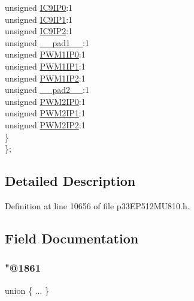 \begin{DoxyCompactItemize}
\begin{tabbing}
\>\>unsigned \hyperlink{structtag_i_p_c23_b_i_t_s_a5c35ef1d196139e7b212452a079ea4e5}{IC9IP0}:1\\
\>\>unsigned \hyperlink{structtag_i_p_c23_b_i_t_s_a2a0f50aa14d292daaa9cafe25a2d9338}{IC9IP1}:1\\
\>\>unsigned \hyperlink{structtag_i_p_c23_b_i_t_s_a6142a9a6f806d132e086c64963112700}{IC9IP2}:1\\
\>\>unsigned \hyperlink{structtag_i_p_c23_b_i_t_s_acaf2d0924a107ec6e8d2e31febaf66f9}{\_\_pad1\_\_}:1\\
\>\>unsigned \hyperlink{structtag_i_p_c23_b_i_t_s_a9616870737c59d2aa83118eb90d7c5f3}{PWM1IP0}:1\\
\>\>unsigned \hyperlink{structtag_i_p_c23_b_i_t_s_a7cf40cd6daf25f32f0d4a85917bdfdd8}{PWM1IP1}:1\\
\>\>unsigned \hyperlink{structtag_i_p_c23_b_i_t_s_aeb4e1806a75ab814d71a4c8b1f2041f0}{PWM1IP2}:1\\
\>\>unsigned \hyperlink{structtag_i_p_c23_b_i_t_s_a4d97cc5f7d51d22fc2bf3eab35c9cb7f}{\_\_pad2\_\_}:1\\
\>\>unsigned \hyperlink{structtag_i_p_c23_b_i_t_s_a29e3155251df4e526fc995fd9307bb1a}{PWM2IP0}:1\\
\>\>unsigned \hyperlink{structtag_i_p_c23_b_i_t_s_adf1274b1daffd4e654b8ae4a51dbd01f}{PWM2IP1}:1\\
\>\>unsigned \hyperlink{structtag_i_p_c23_b_i_t_s_a321e86dd3c70d89049218c7311a0abed}{PWM2IP2}:1\\
\>\} \\
\}; \\

\end{tabbing}\end{DoxyCompactItemize}


\subsection{Detailed Description}


Definition at line 10656 of file p33\+E\+P512\+M\+U810.\+h.



\subsection{Field Documentation}
\mbox{\label{structtag_i_p_c23_b_i_t_s_a4dc12049d8a55b89b54d35c999e52da1}} 
\subsubsection{\texorpdfstring{"@1861}{@1861}}
{\footnotesize\ttfamily union \{ ... \} }

